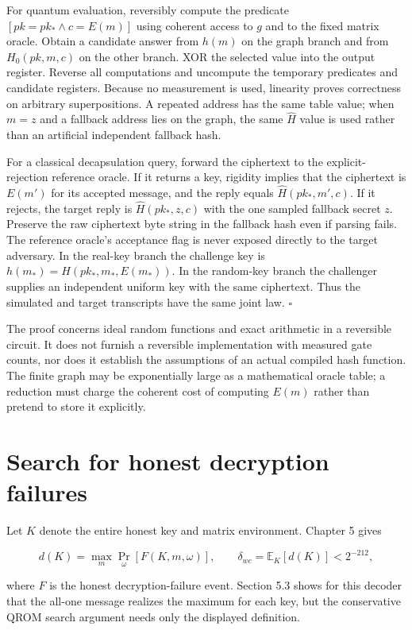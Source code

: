 \documentclass[
  11pt,
  a4paper,
  oneside]{report}
\begin{document}
For quantum evaluation, reversibly compute the predicate
\([pk=pk_*\wedge c=E(m)]\) using coherent access to \(g\) and to the
fixed matrix oracle. Obtain a candidate answer from \(h(m)\) on the
graph branch and from \(H_0(pk,m,c)\) on the other branch. XOR the
selected value into the output register. Reverse all computations and
uncompute the temporary predicates and candidate registers. Because no
measurement is used, linearity proves correctness on arbitrary
superpositions. A repeated address has the same table value; when
\(m=z\) and a fallback address lies on the graph, the same
\(\widehat H\) value is used rather than an artificial independent
fallback hash.

For a classical decapsulation query, forward the ciphertext to the
explicit-rejection reference oracle. If it returns a key, rigidity
implies that the ciphertext is \(E(m')\) for its accepted message, and
the reply equals \(\widehat H(pk_*,m',c)\). If it rejects, the target
reply is \(\widehat H(pk_*,z,c)\) with the one sampled fallback secret
\(z\). Preserve the raw ciphertext byte string in the fallback hash even
if parsing fails. The reference oracle's acceptance flag is never
exposed directly to the target adversary. In the real-key branch the
challenge key is \(h(m_*)=\widehat H(pk_*,m_*,E(m_*))\). In the
random-key branch the challenger supplies an independent uniform key
with the same ciphertext. Thus the simulated and target transcripts have
the same joint law. \(\square\)

The proof concerns ideal random functions and exact arithmetic in a
reversible circuit. It does not furnish a reversible implementation with
measured gate counts, nor does it establish the assumptions of an actual
compiled hash function. The finite graph may be exponentially large as a
mathematical oracle table; a reduction must charge the coherent cost of
computing \(E(m)\) rather than pretend to store it explicitly.

\section{Search for honest decryption
failures}\label{search-for-honest-decryption-failures}

Let \(K\) denote the entire honest key and matrix environment. Chapter 5
gives

\[
d(K)=\max_m\Pr_{\omega}[F(K,m,\omega)],
\qquad \delta_{wc}=\mathbb E_K[d(K)]<2^{-212},
\]

where \(F\) is the honest decryption-failure event. Section 5.3 shows
for this decoder that the all-one message realizes the maximum for each
key, but the conservative QROM search argument needs only the displayed
definition.
\end{document}
